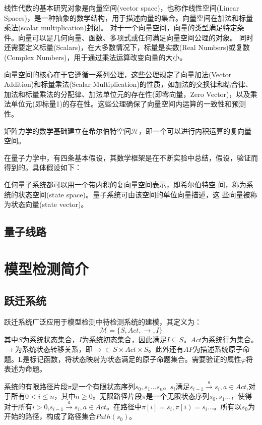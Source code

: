 线性代数的基本研究对象是向量空间(vector space)，也称作线性空间(Linear Spaces)，是一种抽象的数学结构，用于描述向量的集合。向量空间在加法和标量乘法(scalar multiplication)封闭。
对于一个向量空间，向量的类型满足特定条件。向量可以是几何向量、函数、多项式或任何满足向量空间公理的对象。
同时还需要定义标量(Scalars)，在大多数情况下，标量是实数(Real Numbers)或复数(Complex Numbers)，用于通过乘法运算改变向量的大小。

向量空间的核心在于它遵循一系列公理，这些公理规定了向量加法(Vector Addition)和标量乘法(Scalar Multiplication)的性质，如加法的交换律和结合律、加法和标量乘法的分配律、加法单位元的存在性(即零向量，Zero Vector)，以及乘法单位元(即标量1)的存在性。这些公理确保了向量空间内运算的一致性和预测性。


矩阵力学的数学基础建立在希尔伯特空间\(\mathcal{H}\)，即一个可以进行内积运算的复向量空间。




在量子力学中，有四条基本假设，其数学框架是在不断实验中总结，假设，验证而得到的。具体假设如下：
\begin{myen}
    \item 任何量子系统都可以用一个带内积的复向量空间表示，即希尔伯特空
    间，称为系统的状态空间(state space)。量子系统可由该空间的单位向量描述，这
    些向量被称为状态向量(state vector)。
\end{myen}

\subsection{量子线路}

\section{模型检测简介}
\subsection{跃迁系统}
跃迁系统广泛应用于模型检测中待检测系统的建模，其定义为\citep{baier2008principles}：
\begin{equation}
\mathcal{M}=\{S,Act,\rightarrow,I\}
\end{equation}
其中\(S\)为系统状态集合，\(I\)为系统初态集合，因此满足\(I\subseteq S\)。\(Act\)为系统行为集合。\(\rightarrow\)为系统状态转移关系，即\(\rightarrow\subset S\times Act\times S\)。此外还有\(AP\)为描述系统原子命题。L是标记函数，将状态映射为状态满足的原子命题集合。需要验证的属性\(\varphi\)将表述为命题。


系统的有限路径片段\(\pi\)是一个有限状态序列\(s_0,s_1\ldots s_n\)。\(s_i\)满足\(s_{i-1}\overset{a}{\rightarrow}s_i,a\in Act\),对于所有\(0<i\leq n\)，其中\(n\geq 0 \)。无限路径片段\(\pi\)是一个无限状态序列\(s_0,s_1\ldots\)，使得对于所有\(i>0\),\(s_{i-1} \overset{a}{\rightarrow}  s_i,a\in Act\)。在路径中\(\pi\left[i\right]=s_i,\pi\left[i\right)=s_i\ldots\)。所有以\(s_0\)为开始的路径，构成了路径集合\(Path\left(s_0\right)\)。

